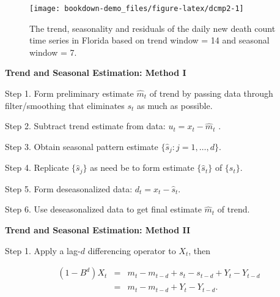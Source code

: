 \documentclass[]{book}
\newenvironment{Shaded}{\begin{snugshade}}{\end{snugshade}}
\newcommand{\KeywordTok}[1]{\textcolor[rgb]{0.13,0.29,0.53}{\textbf{#1}}}
\newcommand{\DataTypeTok}[1]{\textcolor[rgb]{0.13,0.29,0.53}{#1}}
\newcommand{\DecValTok}[1]{\textcolor[rgb]{0.00,0.00,0.81}{#1}}
\newcommand{\StringTok}[1]{\textcolor[rgb]{0.31,0.60,0.02}{#1}}
\newcommand{\OtherTok}[1]{\textcolor[rgb]{0.56,0.35,0.01}{#1}}
\newcommand{\OperatorTok}[1]{\textcolor[rgb]{0.81,0.36,0.00}{\textbf{#1}}}
\newcommand{\NormalTok}[1]{#1}
\begin{document}
\begin{Shaded}
\end{Shaded}

\begin{figure}

{\centering \texttt{[image: bookdown-demo\_files/figure-latex/dcmp2-1]} 

}

\caption{The trend, seasonality and residuals of the daily new death count time series in Florida based on trend window = 14 and seasonal window = 7.}\label{fig:dcmp2}
\end{figure}

\textbf{Trend and Seasonal Estimation: Method I}

Step 1. Form preliminary estimate \(\hat{m}_t\) of trend by passing data
through filter/smoothing that eliminates \(s_t\) as much as possible.

Step 2. Subtract trend estimate from data: \(u_t = x_t - \hat{m}_t\) .

Step 3. Obtain seasonal pattern estimate
\(\{\hat{s}_j : j = 1,\ldots,d\}\).

Step 4. Replicate \(\{\hat{s}_j\}\) as need be to form estimate
\(\{\hat{s}_t\}\) of \(\{s_t\}\).

Step 5. Form deseasonalized data: \(d_t = x_t -\hat{s}_t\).

Step 6. Use deseasonalized data to get final estimate \(\hat{m}_t\) of
trend.

\textbf{Trend and Seasonal Estimation: Method II}

Step 1. Apply a lag-\(d\) differencing operator to \(X_t\), then

\begin{eqnarray*}
(1-B^d)X_t&=&m_t-m_{t-d}+s_t-s_{t-d}+Y_t-Y_{t-d}\\
&=&m_t-m_{t-d}+Y_t-Y_{t-d}.
\end{eqnarray*}
\end{document}
